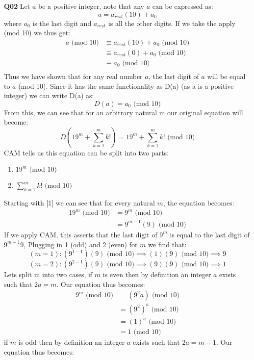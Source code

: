 \documentclass[11pt]{article}
\begin{document}
\parindent=0pt


\textbf{Q02} Let $a$ be a positive integer, note that any $a$ can be expressed as:
\[ a = a_{rest}(10) + a_0  \] 
 where $a_0$ is the last digit and $a_{rest}$ is all the other digits. If we take the apply (mod 10) we thus get:
\begin{align*}
a \text{ (mod 10)} & \equiv  a_{rest}(10) + a_0  \text{ (mod 10)} \\
& \equiv  a_{rest}(0) + a_0  \text{ (mod 10)} \\
& \equiv  a_0  \text{ (mod 10)} \\
\end{align*}
Thus we have shown that for any real number $a$, the last digit of $a$ will be equal to $a$ (mod 10). Since it has the same functionality as D(a) (as a is a positive integer) we can write D(a) as:
\[ D(a) = a_0 \text{ (mod 10)}  \] 
From this, we can see that for an arbitrary natural m our original equation will become:
\[  D(19^m + \sum\limits_{k = 1}^m k!) = 19^m + \sum\limits_{k = 1}^m k! \text{ (mod 10)} \]
CAM tells us this equation can be split into two parts:
\begin{enumerate}
\item $19^m   \text{ (mod 10)}$
\item $\sum\limits_{k = 1}^m k! \text{ (mod 10)}$
\end{enumerate}
Starting with [1] we can see that for every natural $m$, the equation becomes:
\begin{align*}
19^m \text{ (mod 10)} & = 9^m \text{ (mod 10)} \\
 & = 9^{m-1}(9) \text{ (mod 10)}
\end{align*}
If we apply CAM, this asserts that the last digit of $9^m$ is equal to the last digit of $9^{m-1}9$, Plugging in 1 (odd) and 2 (even) for $m$ we find that:
\[ (m = 1): (9^{1-1})(9) \text{ (mod 10)} \implies (1)(9) \text{ (mod 10)} \implies 9 \]
\[ (m = 2): (9^{2-1})(9) \text{ (mod 10)} \implies (9)(9) \text{ (mod 10)} \implies 1 \]
Lets split m into two cases, if $m$ is even then by definition an integer $a$ exists such that $2a = m$. Our equation thus becomes:
\begin{align*}
 9^m \text{ (mod 10)} & = (9^2a) \text{ (mod 10)}\\
& =(9^2)^a \text{ (mod 10)}\\
& =(1)^a \text{ (mod 10)}\\
& =1 \text{ (mod 10)}
\end{align*}
if $m$ is odd then by definition an integer $a$ exists such that $2a = m - 1$. Our equation thus becomes:
\end{document}
